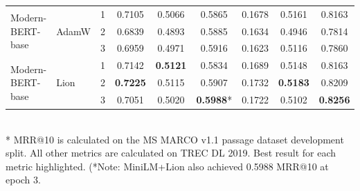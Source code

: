 \documentclass[conference]{IEEEtran}
\begin{document}
\begin{table}[htbp]
\begin{tabular}{l l c c c c c c c}
\midrule
\multirow{3}{*}{Modern-BERT-base} & \multirow{3}{*}{AdamW}
    & 1 & 0.7105 & 0.5066 & 0.5865 & 0.1678 & 0.5161 & 0.8163 \\
    & & 2 & 0.6839 & 0.4893 & 0.5885 & 0.1634 & 0.4946 & 0.7814 \\
    & & 3 & 0.6959 & 0.4971 & 0.5916 & 0.1623 & 0.5116 & 0.7860 \\ %
\midrule
\multirow{3}{*}{Modern-BERT-base} & \multirow{3}{*}{Lion}
    & 1 & 0.7142 & \cellcolor{yellow!50}\textbf{0.5121} & 0.5834 & 0.1689 & 0.5148 & 0.8163 \\
    & & 2 & \cellcolor{yellow!50}\textbf{0.7225} & 0.5115 & 0.5907 & 0.1732 & \cellcolor{yellow!50}\textbf{0.5183} & 0.8209 \\
    & & 3 & 0.7051 & 0.5020 & \cellcolor{yellow!50}\textbf{0.5988}* & 0.1722 & 0.5102 & \cellcolor{yellow!50}\textbf{0.8256} \\
\bottomrule
\end{tabular}
\vspace{1em}\\
\footnotesize{* MRR@10 is calculated on the MS MARCO v1.1 passage dataset development split. All other metrics are calculated on TREC DL 2019. Best result for each metric highlighted. (*Note: MiniLM+Lion also achieved 0.5988 MRR@10 at epoch 3.}
\end{table}
\end{document}
